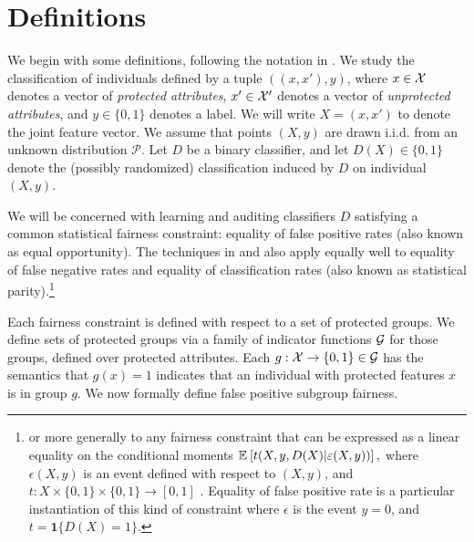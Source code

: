 
\section{Definitions}
We begin with some definitions, following the notation in
\cite{KNRW18}.  We study the classification of individuals defined by
a tuple $((x, x'), y)$, where $x\in \mathcal{X}$ denotes a vector of
\emph{protected attributes}, $x'\in \mathcal{X}'$ denotes a vector of
\emph{unprotected attributes}, and $y\in \{0, 1\}$ denotes a label. We
will write $X = (x, x')$ to denote the joint feature vector. We assume
that points $(X, y)$ are drawn i.i.d. from an unknown distribution
$\mathcal{P}$.  Let $D$ be a binary classifier, and let
$D(X) \in \{0,1\}$ denote the (possibly randomized) classification
induced by $D$ on individual $(X,y)$.



We will be concerned with learning and auditing classifiers $D$
satisfying a common statistical fairness constraint: equality
of false positive rates (also known as equal opportunity). The techniques in \citet{MSR} and \citet{KNRW18} also apply equally well to equality of false negative rates and equality of
classification rates (also known as statistical parity).\footnote{or more generally to any fairness constraint  that can be expressed as a linear equality on the conditional moments $\operatorname*{\mathbb{E}}_{}\left[t(X, y, D(X) | \varepsilon(X,y))\right],$ where $\epsilon(X,y)$ is an event defined with respect to $(X, y)$, and
$t: X \times \{0,1\} \times \{0,1\} \to [0,1]$ \cite{MSR}.  Equality of false positive rate is a particular instantiation of this kind of constraint where $\epsilon$  is the event $y = 0$, and $t = \textbf{1}\{D(X) =1\}$.}


Each fairness constraint is defined with
respect to a set of protected groups. We define sets of protected
groups via a family of indicator functions $\mathcal{G}$ for those groups,
defined over protected attributes. Each $g:\mathcal{X} \to \{0,1\} \in \mathcal{G}$
has the semantics that $g(x) = 1$ indicates that an individual with
protected features $x$ is in group $g$.
 We now formally define
false positive subgroup fairness.


